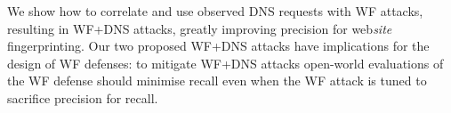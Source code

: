 We show how to correlate and use observed DNS requests with WF attacks,
resulting in WF+DNS attacks, greatly
improving precision for web\emph{site} fingerprinting.
Our two proposed WF+DNS attacks have implications for the design of WF defenses:
to mitigate WF+DNS attacks open-world evaluations of the WF defense should
minimise recall even when the WF attack is tuned to sacrifice precision for
recall.
